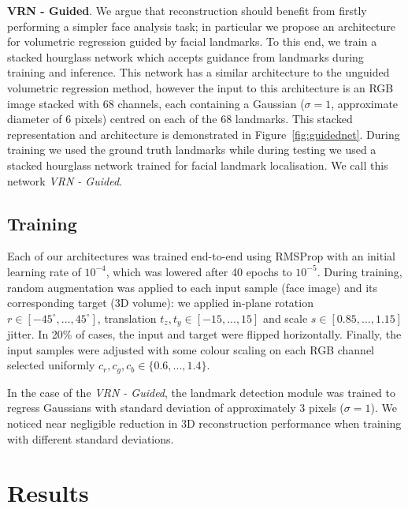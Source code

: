 \textbf{VRN - Guided}. We argue that reconstruction should benefit
from firstly performing a simpler face analysis task; in particular we
propose an architecture for volumetric regression guided by facial
landmarks. To this end, we train a stacked hourglass network which
accepts guidance from landmarks during training and inference. This
network has a similar architecture to the unguided volumetric
regression method, however the input to this architecture is an RGB
image stacked with 68 channels, each containing a Gaussian ($\sigma =
1$, approximate diameter of 6 pixels) centred on each of the 68
landmarks. This stacked representation and architecture is
demonstrated in Figure~\ref{fig:guidednet}. During training we used the
ground truth landmarks while during testing we used a stacked
hourglass network trained for facial landmark localisation. We call
this network \textit{VRN - Guided}.




\subsection{Training}

Each of our architectures was trained end-to-end using RMSProp with an
initial learning rate of $10^{-4}$, which was lowered after 40 epochs
to $10^{-5}$. During training, random augmentation was applied to each
input sample (face image) and its corresponding target (3D volume): we
applied in-plane rotation $r\in[-45^{\circ}, ..., 45^{\circ}]$,
translation $t_z,t_y\in[-15,...,15]$ and scale $s\in [0.85,...,1.15]$
jitter. In 20\% of cases, the input and target were flipped
horizontally. Finally, the input samples were adjusted with some
colour scaling on each RGB channel selected uniformly
$c_r,c_g,c_b \in \{0.6,...,1.4\}$.

In the case of the \textit{VRN - Guided}, the landmark detection
module was trained to regress Gaussians with standard deviation of
approximately 3 pixels ($\sigma = 1$). We noticed near negligible
reduction in 3D reconstruction performance when training with
different standard deviations.



\section{Results} \label{S:Results}

